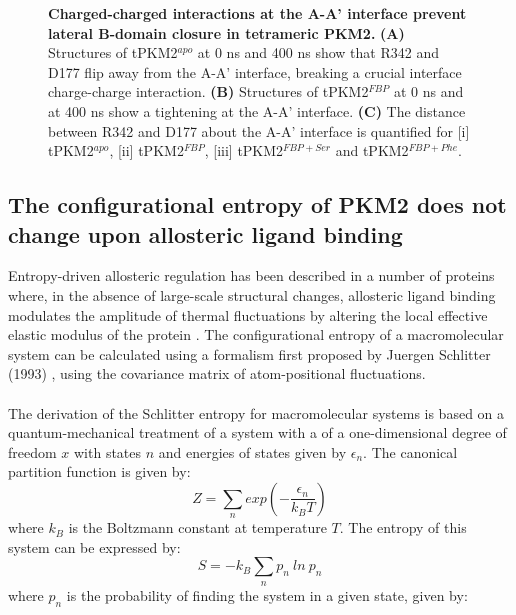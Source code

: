 \begin{figure}[!ht]
\caption[Charged-charged interactions at the A-A' interface prevent lateral B-domain closure in tetrameric PKM2.]{\textbf{Charged-charged interactions at the A-A' interface prevent lateral B-domain closure in tetrameric PKM2.} \textbf{(A)} Structures of tPKM2$^{apo}$ at 0 ns and 400 ns show that R342 and D177 flip away from the A-A' interface, breaking a crucial interface charge-charge interaction. \textbf{(B)} Structures of tPKM2$^{FBP}$ at 0 ns and at 400 ns show a tightening at the A-A' interface. \textbf{(C)} The distance between R342 and D177 about the A-A' interface is quantified for [i] tPKM2$^{apo}$, [ii] tPKM2$^{FBP}$, [iii] tPKM2$^{FBP+Ser}$ and tPKM2$^{FBP+Phe}$.}
\label{fig:tet_bdomain}
\end{figure}
%
%
\clearpage

\subsection{The configurational entropy of PKM2 does not change upon allosteric ligand binding}
\label{subsec:config_entropy}
Entropy-driven allosteric regulation has been described in a number of proteins \cite{Capdevila:2017aa,Cooper:1984aa,Popovych:2006aa,Saavedra:2018aa,Tzeng:2012aa} where, in the absence of large-scale structural changes, allosteric ligand binding modulates the amplitude of thermal fluctuations by altering the local effective elastic modulus of the protein \cite{Motlagh:2014aa}. The configurational entropy of a macromolecular system can be calculated using a formalism first proposed by Juergen Schlitter (1993) \cite{Schlitter:1993aa}, using the covariance matrix of atom-positional fluctuations. 
%
%
\\\\
%
%
The derivation of the Schlitter entropy for macromolecular systems is based on a quantum-mechanical treatment of a system with a of a one-dimensional degree of freedom $x$ with states $n$ and energies of states given by $\epsilon_{n}$. The canonical partition function is given by:
%
%
\begin{equation}
Z = \sum_{n} exp \left(- \frac{\epsilon_{n}}{k_{B}T} \right)
\end{equation}
%
%
where $k_{B}$ is the Boltzmann constant at temperature $T$. The entropy of this system can be expressed by:
%
%
\begin{equation}
S = -k_{B} \sum_{n} p_{n} \: ln \: p_{n}
\end{equation}
%
%
where $p_{n}$ is the probability of finding the system in a given state, given by:
